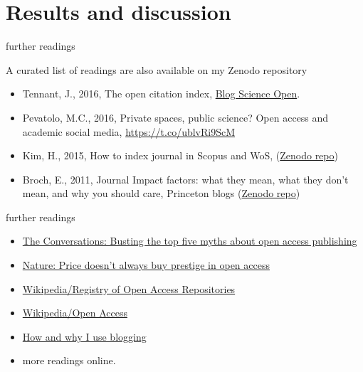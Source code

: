 \documentclass[10pt]{beamer}
\begin{document}
\section{Results and discussion}

\begin{frame}{further readings}

	A curated list of readings are also available on my Zenodo repository 
	\begin{itemize}
    \item Tennant, J., 2016, The open citation index, \href{http://blog.scienceopen.com/2016/02/the-open-citation-index/}{Blog Science Open}. 
    \item Pevatolo, M.C., 2016, Private spaces, public science?
Open access and academic social media, \url{https://t.co/ublvRi9ScM}
    \item Kim, H., 2015, How to index journal in Scopus and WoS, (\href{https://zenodo.org/deposit/125607/}{Zenodo repo})
    \item Broch, E., 2011, Journal Impact factors: what they mean, what they don't mean, and why you should care, Princeton blogs (\href{https://zenodo.org/deposit/125607/}{Zenodo repo})
    \end{itemize}
    
\end{frame}

\begin{frame}{further readings}
\begin{itemize}
    \item \href{http://theconversation.com/busting-the-top-five-myths-about-open-access-publishing-14792}{The Conversations:
Busting the top five myths about open access publishing
}
    \item \href{http://www.nature.com/news/price-doesn-t-always-buy-prestige-in-open-access-1.12259}{Nature: Price doesn't always buy prestige in open access}
    \item \href{https://en.wikipedia.org/wiki/Registry_of_Open_Access_Repositories}{Wikipedia/Registry of Open Access Repositories}
    \item \href{https://en.wikipedia.org/wiki/Open_access}{Wikipedia/Open Access}
    \item \href{http://www.slideshare.net/flxlex/how-and-why-i-use-blogging?qid=19764e8a-1bdc-4878-b275-497c85cd664f&v=&b=&from_search=7}{How and why I use blogging}
    \item more readings online.
\end{itemize}
    
\end{frame}
\end{document}
